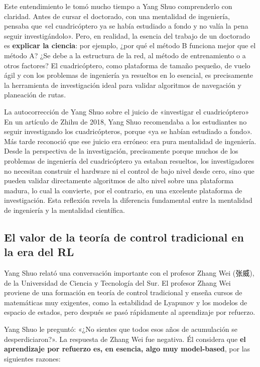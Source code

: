 Este entendimiento le tomó mucho tiempo a Yang Shuo comprenderlo con claridad. Antes de cursar el doctorado, con una mentalidad de ingeniería, pensaba que «el cuadricóptero ya se había estudiado a fondo y no valía la pena seguir investigándolo». Pero, en realidad, la esencia del trabajo de un doctorado es \textbf{explicar la ciencia}: por ejemplo, ¿por qué el método B funciona mejor que el método A? ¿Se debe a la estructura de la red, al método de entrenamiento o a otros factores? El cuadricóptero, como plataforma de tamaño pequeño, de vuelo ágil y con los problemas de ingeniería ya resueltos en lo esencial, es precisamente la herramienta de investigación ideal para validar algoritmos de navegación y planeación de rutas.

\begin{knowledgebox}{La autocorrección de Yang Shuo sobre el juicio de «investigar el cuadricóptero»}
En un artículo de Zhihu de 2018, Yang Shuo recomendaba a los estudiantes no seguir investigando los cuadricópteros, porque «ya se habían estudiado a fondo». Más tarde reconoció que ese juicio era erróneo: era pura mentalidad de ingeniería. Desde la perspectiva de la investigación, precisamente porque muchos de los problemas de ingeniería del cuadricóptero ya estaban resueltos, los investigadores no necesitan construir el hardware ni el control de bajo nivel desde cero, sino que pueden validar directamente algoritmos de alto nivel sobre una plataforma madura, lo cual la convierte, por el contrario, en una excelente plataforma de investigación. Esta reflexión revela la diferencia fundamental entre la mentalidad de ingeniería y la mentalidad científica.
\end{knowledgebox}

\subsection{El valor de la teoría de control tradicional en la era del RL}

Yang Shuo relató una conversación importante con el profesor Zhang Wei (张威), de la Universidad de Ciencia y Tecnología del Sur. El profesor Zhang Wei proviene de una formación en teoría de control tradicional y enseña cursos de matemáticas muy exigentes, como la estabilidad de Lyapunov y los modelos de espacio de estados, pero después se pasó rápidamente al aprendizaje por refuerzo.

Yang Shuo le preguntó: «¿No sientes que todos esos años de acumulación se desperdiciaron?». La respuesta de Zhang Wei fue negativa. Él considera que \textbf{el aprendizaje por refuerzo es, en esencia, algo muy model-based}, por las siguientes razones:

